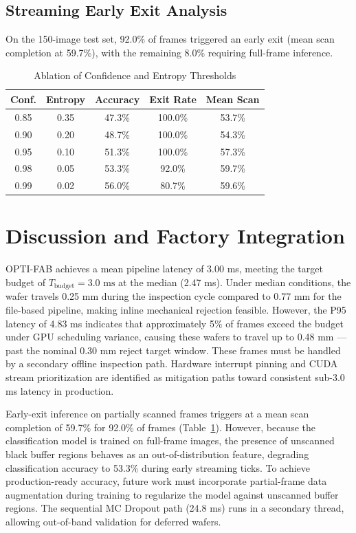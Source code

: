 \documentclass[conference]{IEEEtran}
\begin{document}
\subsection{Streaming Early Exit Analysis}
On the 150-image test set, 92.0\% of frames triggered an early exit (mean scan completion at 59.7\%), with the remaining 8.0\% requiring full-frame inference.

\begin{table}[h]
\centering
\caption{Ablation of Confidence and Entropy Thresholds}
\label{tab:ablation}
\setlength{\tabcolsep}{4pt}
\footnotesize
\begin{tabular}{ccccc}
\toprule
\textbf{Conf.} & \textbf{Entropy} & \textbf{Accuracy} & \textbf{Exit Rate} & \textbf{Mean Scan} \\
\midrule
0.85 & 0.35 & 47.3\% & 100.0\% & 53.7\% \\
0.90 & 0.20 & 48.7\% & 100.0\% & 54.3\% \\
0.95 & 0.10 & 51.3\% & 100.0\% & 57.3\% \\
0.98 & 0.05 & 53.3\% & 92.0\% & 59.7\% \\
0.99 & 0.02 & 56.0\% & 80.7\% & 59.6\% \\
\bottomrule
\end{tabular}
\end{table}

\section{Discussion and Factory Integration}
OPTI-FAB achieves a mean pipeline latency of 3.00 ms, meeting the target budget of $T_{\text{budget}} = 3.0\text{ ms}$ at the median (2.47 ms). Under median conditions, the wafer travels 0.25 mm during the inspection cycle compared to 0.77 mm for the file-based pipeline, making inline mechanical rejection feasible. However, the P95 latency of 4.83 ms indicates that approximately 5\% of frames exceed the budget under GPU scheduling variance, causing these wafers to travel up to 0.48 mm --- past the nominal 0.30 mm reject target window. These frames must be handled by a secondary offline inspection path. Hardware interrupt pinning and CUDA stream prioritization are identified as mitigation paths toward consistent sub-3.0 ms latency in production.

Early-exit inference on partially scanned frames triggers at a mean scan completion of 59.7\% for 92.0\% of frames (Table~\ref{tab:ablation}). However, because the classification model is trained on full-frame images, the presence of unscanned black buffer regions behaves as an out-of-distribution feature, degrading classification accuracy to 53.3\% during early streaming ticks. To achieve production-ready accuracy, future work must incorporate partial-frame data augmentation during training to regularize the model against unscanned buffer regions. The sequential MC Dropout path (24.8 ms) runs in a secondary thread, allowing out-of-band validation for deferred wafers.
\end{document}
